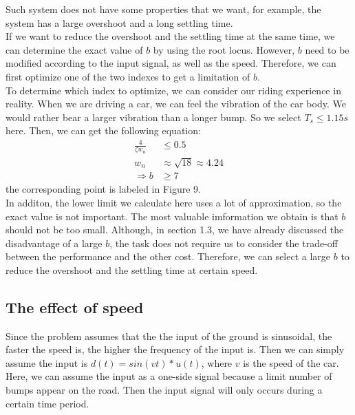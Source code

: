 \documentclass{article}
\begin{document}
Such system does not have some properties that we want, for example,
the system has a large overshoot and a long settling time.\\

If we want to reduce the overshoot and the settling time at the same time,
we can determine the exact value of $b$ by using the root locus.
However, $b$ need to be modified according to the input signal, as well as the speed.
Therefore, we can first optimize one of the two indexes to get a limitation of $b$.\\

To determine which index to optimize, we can consider our riding experience in reality.
When we are driving a car, we can feel the vibration of the car body.
We would rather bear a larger vibration than a longer bump.
So we select $T_s\leq 1.15s $ here.
Then, we can get the following equation:
\begin{align*}
    \frac{4}{\zeta w_n} &\leq 0.5\\
    w_n &\approx \sqrt{18}\approx 4.24\\
    \Rightarrow b&\geq 7
\end{align*}
the corresponding point is labeled in Figure 9.\\

In additon, the lower limit we calculate here uses a lot of approximation,
so the exact value is not important.
The most valuable imformation we obtain is that $b$ should not be too small.
Although, in section 1.3, we have already discussed the disadvantage of a large $b$,
the task does not require us to consider the trade-off between the performance and the other cost.
Therefore, we can select a large $b$ to reduce the overshoot and the settling time at certain speed.\\

\subsection{The effect of speed}

Since the problem assumes that the the input of the ground is sinusoidal,
the faster the speed is, the higher the frequency of the input is.
Then we can simply assume the input is $d(t) = sin(vt)*u(t)$,
where $v$ is the speed of the car.
Here, we can assume the input as a one-side signal because a limit number of bumps appear on the road.
Then the input signal will only occurs during a certain time period.\\
\end{document}
